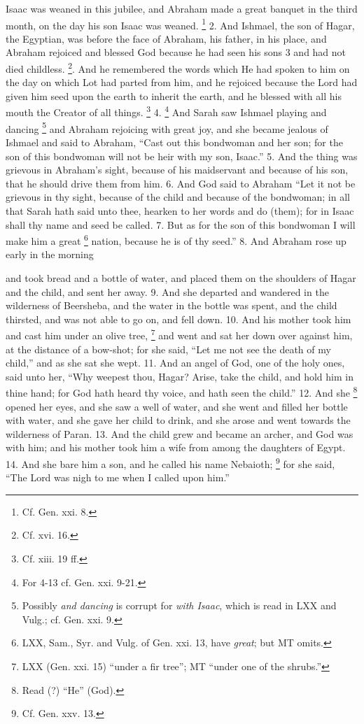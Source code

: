 Isaac was weaned in this jubilee, and Abraham made a great banquet in the third month, on the day his son Isaac was weaned. \footnote{Cf. Gen. xxi. 8.} 2. And Ishmael, the son of Hagar, the Egyptian, was before the face of Abraham, his father, in his place, and Abraham rejoiced and blessed God because he had seen his sons 3 and had not died childless. \footnote{Cf. xvi. 16.}. And he remembered the words which He had spoken to him on the day on which Lot had parted from him, and he rejoiced because the Lord had given him seed upon the earth to inherit the earth, and he blessed with all his mouth the Creator of all things. \footnote{Cf. xiii. 19 ff.} 4. \footnote{For 4-13 cf. Gen. xxi. 9-21.} And Sarah saw Ishmael playing and dancing \footnote{Possibly \emph{and dancing} is corrupt for \emph{with Isaac}, which is read in LXX and Vulg.; cf. Gen. xxi. 9.} and Abraham rejoicing with great joy, and she became jealous of Ishmael and said to Abraham, ``Cast out this bondwoman and her son; for the son of this bondwoman will not be heir with my son, Isaac.'' 5. And the thing was grievous in Abraham's sight, because of his maidservant and because of his son, that he should drive them from him. 6. And God said to Abraham ``Let it not be grievous in thy sight, because of the child and because of the bondwoman; in all that Sarah hath said unto thee, hearken to her words and do (them); for in Isaac shall thy name and seed be called. 7. But as for the son of this bondwoman I will make him a great \footnote{LXX, Sam., Syr. and Vulg. of Gen. xxi. 13, have \emph{great}; but MT omits.} nation, because he is of thy seed.'' 8. And Abraham rose up early in the morning

and took bread and a bottle of water, and placed them on the shoulders of Hagar and the child, and sent her away. 9. And she departed and wandered in the wilderness of Beersheba, and the water in the bottle was spent, and the child thirsted, and was not able to go on, and fell down. 10. And his mother took him and cast him under an olive tree, \footnote{LXX (Gen. xxi. 15) ``under a fir tree''; MT ``under one of the shrubs.''} and went and sat her down over against him, at the distance of a bow-shot; for she said, ``Let me not see the death of my child,'' and as she sat she wept. 11. And an angel of God, one of the holy ones, said unto her, ``Why weepest thou, Hagar? Arise, take the child, and hold him in thine hand; for God hath heard thy voice, and hath seen the child.'' 12. And she \footnote{Read (?) ``He'' (God).} opened her eyes, and she saw a well of water, and she went and filled her bottle with water, and she gave her child to drink, and she arose and went towards the wilderness of Paran. 13. And the child grew and became an archer, and God was with him; and his mother took him a wife from among the daughters of Egypt. 14. And she bare him a son, and he called his name Nebaioth; \footnote{Cf. Gen. xxv. 13.} for she said, ``The Lord was nigh to me when I called upon him.''

